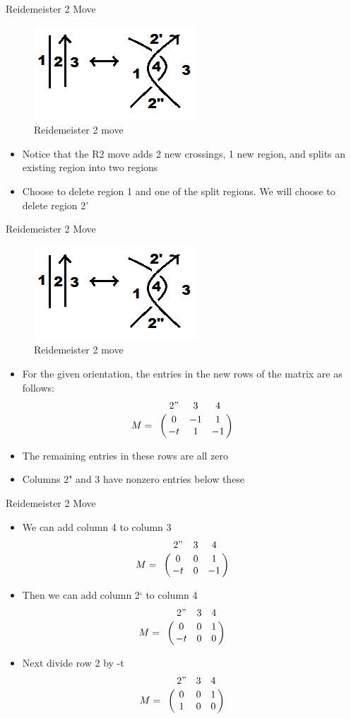 \documentclass[10pt]{beamer}
\begin{document}
\begin{frame}{Reidemeister 2 Move}
  \begin{figure}
  \includegraphics[scale=0.5]{R2_2.png}
  \caption{Reidemeister 2 move}
\end{figure}
\begin{itemize}
\item Notice that the R2 move adds 2 new crossings, 1 new region, and splits an existing region into two regions
\item Choose to delete region 1 and one of the split regions. We will choose to delete region 2'
\end{itemize}
\end{frame}

\begin{frame}{Reidemeister 2 Move}
  \begin{figure}
  \includegraphics[scale=0.5]{R2_2.png}
  \caption{Reidemeister 2 move}
  \end{figure}
  \begin{itemize}
  \item For the given orientation, the entries in the new rows of the matrix are as follows:
  \[
  M=
  \bordermatrix{ & 2" & 3 & 4 \cr
  & 0 & -1 & 1 \cr
  & -t & 1 & -1 } \qquad
  \]
  \item The remaining entries in these rows are all zero
  \item Columns 2" and 3 have nonzero entries below these
  \end{itemize}
\end{frame}

\begin{frame}{Reidemeister 2 Move}
\begin{itemize}
\item We can add column 4 to column 3
  \[
  M=
  \bordermatrix{ & 2" & 3 & 4 \cr
  & 0 & 0 & 1 \cr
  & -t & 0 & -1 } \qquad
  \]
  \item Then we can add column 2` to column 4
  \[
  M=
  \bordermatrix{ & 2" & 3 & 4 \cr
  & 0 & 0 & 1 \cr
  & -t & 0 & 0 } \qquad
  \]
  \item Next divide row 2 by -t
  \[
  M=
  \bordermatrix{ & 2" & 3 & 4 \cr
  & 0 & 0 & 1 \cr
  & 1 & 0 & 0 } \qquad
  \]
  \end{itemize}
\end{frame}
\end{document}
